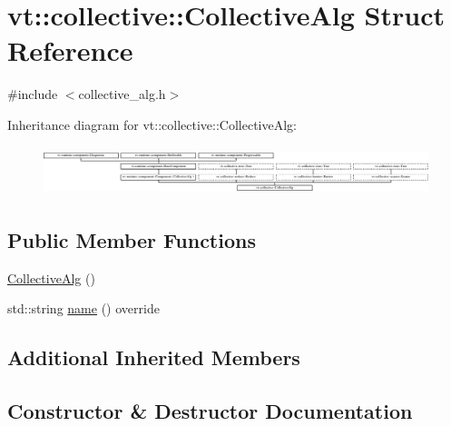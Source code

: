 \hypertarget{structvt_1_1collective_1_1_collective_alg}{}\section{vt\+:\+:collective\+:\+:Collective\+Alg Struct Reference}
\label{structvt_1_1collective_1_1_collective_alg}


{\ttfamily \#include $<$collective\+\_\+alg.\+h$>$}

Inheritance diagram for vt\+:\+:collective\+:\+:Collective\+Alg\+:\begin{figure}[H]
\begin{center}
\leavevmode
\includegraphics[height=1.435897cm]{structvt_1_1collective_1_1_collective_alg}
\end{center}
\end{figure}
\subsection*{Public Member Functions}
\begin{DoxyCompactItemize}
\item 
\hyperlink{structvt_1_1collective_1_1_collective_alg_aa137479fb6afcfa33e73592ea3cbbcd8}{Collective\+Alg} ()
\item 
std\+::string \hyperlink{structvt_1_1collective_1_1_collective_alg_a81788afa34bc094c9f71fef8681aefb3}{name} () override
\end{DoxyCompactItemize}
\subsection*{Additional Inherited Members}


\subsection{Constructor \& Destructor Documentation}
\mbox{\label{structvt_1_1collective_1_1_collective_alg_aa137479fb6afcfa33e73592ea3cbbcd8}} 
